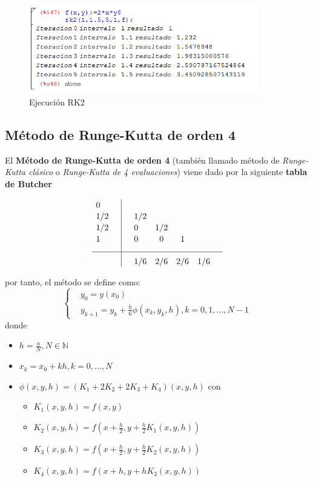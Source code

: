 \documentclass[paper=a4, fontsize=11pt]{scrartcl} %
\numberwithin{equation}{section}
\begin{document}
	\begin{figure}[H]
		\centering
		\includegraphics[width=10cm]{f1.png}
		\caption{Ejecución RK2}
		\label{fig:my_label}
	\end{figure}
	
	\subsection{Método de Runge-Kutta de orden 4}
	El \textbf{Método de Runge-Kutta de orden 4} (también llamado método de \textit{Runge-Kutta clásico} o \textit{Runge-Kutta de 4 evaluaciones}) viene dado por la siguiente \textbf{tabla de Butcher}\begin{table}[h]
		\begin{equation*}
		\begin{array}{l | c c c c c}
		\rule{0pt}{2,3ex} 0    \quad &   &    &     &  &   \\
		\rule{0pt}{2,3ex} 1/2    \quad & \quad 1/2  &              &              &         &   \\
		\rule{0pt}{2,3ex} 1/2 & 0 & 1/2 &  &         &   \\
		\rule{0pt}{2,3ex} 1 & 0  & 0  & 1 &  & \\[2,0ex] \hline
		\rule{0pt}{3,3ex}              & \quad 1/6  & 2/6    & 2/6 & 1/6  & 
		\end{array}
		\end{equation*}
	\end{table}
	por tanto, el método se define como:
	\begin{equation*}
	[RK4]\begin{cases} 
	&\text{$y_0 = y(x_0)$}
	\\
	&\text{$y_{k+1} = y_k + \frac{h}{6}\phi(x_k,y_k,h) , k= 0,1,...,N-1$} 
	\end{cases} 
	\end{equation*}
	donde
	\begin{itemize}
		\item $h=\frac{a}{N} , N\in\mathbb{N}$
		\item $x_k = x_0 + kh , k=0,...,N$
		\item $\phi(x,y,h) = (K_1+2K_2+2K_3+K_4)(x,y,h)$ con 
		\begin{itemize}
			\item $K_1(x,y,h)=f(x,y)$
			\item $K_2(x,y,h)=f(x+\frac{h}{2},y+\frac{h}{2}K_1(x,y,h))$
			\item $K_3(x,y,h)=f(x+\frac{h}{2},y+\frac{h}{2}K_2(x,y,h))$
			\item $K_4(x,y,h)=f(x+h,y+hK_3(x,y,h))$
		\end{itemize}
	\end{itemize}
\end{document}
